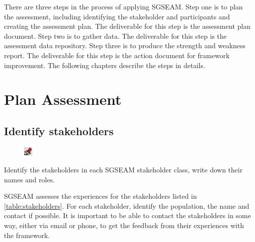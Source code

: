 \documentclass[11pt,oneside]{book}
\begin{document}
There are three steps in the process of applying SGSEAM. Step one is to plan the assessment, including
 identifying the stakeholder and participants and creating the assessment plan. The deliverable for this 
 step is the assessment plan document. Step two is to gather data. The deliverable for this step is the 
 assessment data repository. Step three is to produce the strength and weakness report. The deliverable 
 for this step is the action document for framework improvement. The following chapters describe the 
 steps in details.

\chapter{Plan Assessment}

\section{Identify stakeholders}

\begin{shadebox}
\begin{figure}
\vspace{-15pt}\hspace{-10pt}
    \includegraphics[width=0.04\textwidth]{note-icon}
\end{figure}

Identify the stakeholders in each SGSEAM stakeholder class, write down their names and roles.

\end{shadebox}

SGSEAM assesses the experiences for the stakeholders listed in \autoref{table:stakeholders}. For each 
stakeholder, identify the population, the name and contact if possible. It is important to be able to contact 
the stakeholders in some way, either via email or phone, to get the feedback from their experiences with 
the framework.
\end{document}
